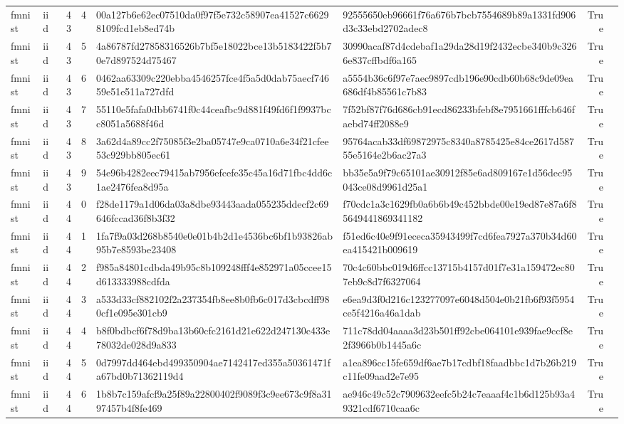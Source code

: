 \begin{tabular}{llrrllrl}
fmnist & iid & 43 & 4 & 00a127b6e62ec07510da0f97f5e732c58907ea41527c66298109fcd1eb8ed74b & 92555650eb96661f76a676b7bcb7554689b89a1331fd906d3c33ebd2702adec8 & True &  \\
fmnist & iid & 43 & 5 & 4a86787fd27858316526b7bf5e18022bce13b5183422f5b70e7d897524d75467 & 30990acaf87d4cdebaf1a29da28d19f2432ecbe340b9c3266e837cffbdf6a165 & True &  \\
fmnist & iid & 43 & 6 & 0462aa63309c220ebba4546257fce4f5a5d0dab75aecf74659e51e511a727dfd & a5554b36c6f97e7aec9897cdb196e90cdb60b68c9de09ea686df4b85561c7b83 & True &  \\
fmnist & iid & 43 & 7 & 55110e5fafa0dbb6741f0c44ceafbc9d881f49fd6f1f9937bcc8051a5688f46d & 7f52bf87f76d686cb91ecd86233bfebf8e7951661fffcb646faebd74ff2088e9 & True &  \\
fmnist & iid & 43 & 8 & 3a62d4a89cc2f75085f3e2ba05747e9ca0710a6e34f21cfee53c929bb805ec61 & 95764acab33df69872975c8340a8785425e84ce2617d58755e5164e2b6ac27a3 & True &  \\
fmnist & iid & 43 & 9 & 54e96b4282eec79415ab7956efcefe35c45a16d71fbc4dd6c1ae2476fea8d95a & bb35e5a9f79c65101ae30912f85e6ad809167e1d56dec95043ce08d9961d25a1 & True &  \\
fmnist & iid & 44 & 0 & f28de1179a1d06da03a8dbe93443aada055235ddecf2c69646fccad36f8b3f32 & f70cdc1a3c1629fb0a6b6b49c452bbde00e19ed87e87a6f85649441869341182 & True &  \\
fmnist & iid & 44 & 1 & 1fa7f9a03d268b8540e0e01b4b2d1e4536bc6bf1b93826ab95b7e8593be23408 & f51ed6c40e9f91ececa35943499f7cd6fea7927a370b34d60ea415421b009619 & True &  \\
fmnist & iid & 44 & 2 & f985a84801cdbda49b95c8b109248fff4e852971a05ccee15d613333988cdfda & 70c4c60bbc019d6ffcc13715b4157d01f7e31a159472ec807eb9c8d7f6327064 & True &  \\
fmnist & iid & 44 & 3 & a533d33cf882102f2a237354fb8ee8b0fb6c017d3cbcdff980cf1e095e301cb9 & e6ea9d3f0d216c123277097e6048d504e0b21fb6f93f5954ce5f4216a46a1dab & True &  \\
fmnist & iid & 44 & 4 & b8f0bdbcf6f78d9ba13b60cfc2161d21e622d247130c433e78032de028d9a833 & 711c78dd04aaaa3d23b501ff92cbe064101e939fae9ccf8e2f3966b0b1445a6c & True &  \\
fmnist & iid & 44 & 5 & 0d7997dd464ebd499350904ae7142417ed355a50361471fa67bd0b71362119d4 & a1ea896cc15fe659df6ae7b17cdbf18faadbbc1d7b26b219c11fe09aad2e7e95 & True &  \\
fmnist & iid & 44 & 6 & 1b8b7c159afcf9a25f89a22800402f9089f3c9ee673c9f8a3197457b4f8fe469 & ae946c49c52c7909632eefc5b24c7eaaaf4c1b6d125b93a49321cdf6710caa6c & True &  \\

\end{tabular}
